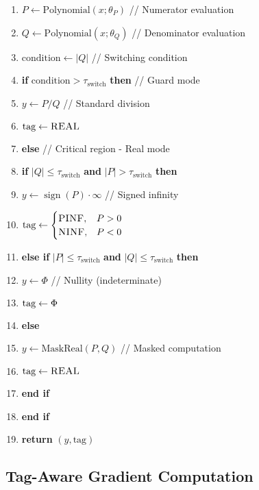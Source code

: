 \documentclass[twoside,11pt]{article}
\newcommand{\trReal}{\textsc{REAL}}
\newcommand{\trPINF}{\textsc{PINF}}
\newcommand{\trNINF}{\textsc{NINF}}
\newcommand{\trPHI}{\textsc{$\Phi$}}
\newcommand{\TAGREAL}{\trReal}
\newcommand{\TAGPINF}{\trPINF}
\newcommand{\TAGNINF}{\trNINF}
\newcommand{\TAGPHI}{\trPHI}
\DeclareMathOperator{\sign}{sign}
\begin{document}
\begin{tcolorbox}[colback=gray!5!white,colframe=gray!75!black,title=\textbf{Algorithm \refstepcounter{algctr}\thealgctr: TR-Rational Layer Forward Pass}]
\begin{enumerate}
\item $P \leftarrow \text{Polynomial}(x; \theta_P)$ \hfill // Numerator evaluation
\item $Q \leftarrow \text{Polynomial}(x; \theta_Q)$ \hfill // Denominator evaluation  
\item $\text{condition} \leftarrow |Q|$ \hfill // Switching condition
\item \textbf{if} $\text{condition} > \tau_{\text{switch}}$ \textbf{then} \hfill // Guard mode
\item \quad $y \leftarrow P / Q$ \hfill // Standard division
\item \quad $\text{tag} \leftarrow \TAGREAL$
\item \textbf{else} \hfill // Critical region - Real mode
\item \quad \textbf{if} $|Q| \leq \tau_{\text{switch}}$ \textbf{and} $|P| > \tau_{\text{switch}}$ \textbf{then}
\item \quad \quad $y \leftarrow \sign(P)\cdot \infty$ \hfill // Signed infinity
\item \quad \quad $\text{tag} \leftarrow \begin{cases}\TAGPINF,& P>0\\ \TAGNINF,& P<0\end{cases}$
\item \quad \textbf{else if} $|P| \leq \tau_{\text{switch}}$ \textbf{and} $|Q| \leq \tau_{\text{switch}}$ \textbf{then}
\item \quad \quad $y \leftarrow \Phi$ \hfill // Nullity (indeterminate)
\item \quad \quad $\text{tag} \leftarrow \TAGPHI$
\item \quad \textbf{else}
\item \quad \quad $y \leftarrow \text{MaskReal}(P, Q)$ \hfill // Masked computation
\item \quad \quad $\text{tag} \leftarrow \TAGREAL$
\item \quad \textbf{end if}
\item \textbf{end if}
\item \textbf{return} $(y, \text{tag})$
\end{enumerate}
\end{tcolorbox}

\subsection{Tag-Aware Gradient Computation}
\end{document}
